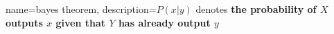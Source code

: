{
  name=bayes theorem,
  description={$ P \left( x|y \right) $ denotes \textbf{the probability of $ X $
  outputs $ x $ given that $ Y $ has already output $ y $}}
}
